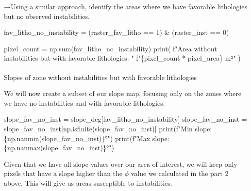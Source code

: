 \documentclass[
  letterpaper,
  DIV=11,
  numbers=noendperiod]{scrartcl}
\makeatletter
\let\oldparagraph\paragraph
\renewcommand{\paragraph}{
    \@ifstar
      \xxxParagraphStar
      \xxxParagraphNoStar
  }
\newcommand{\xxxParagraphStar}[1]{\oldparagraph*{#1}\mbox{}}
\newcommand{\xxxParagraphNoStar}[1]{\oldparagraph{#1}\mbox{}}
\newenvironment{Shaded}{\begin{snugshade}}{\end{snugshade}}
\newcommand{\BuiltInTok}[1]{\textcolor[rgb]{0.00,0.23,0.31}{#1}}
\newcommand{\DecValTok}[1]{\textcolor[rgb]{0.68,0.00,0.00}{#1}}
\newcommand{\NormalTok}[1]{\textcolor[rgb]{0.00,0.23,0.31}{#1}}
\newcommand{\OperatorTok}[1]{\textcolor[rgb]{0.37,0.37,0.37}{#1}}
\newcommand{\SpecialCharTok}[1]{\textcolor[rgb]{0.37,0.37,0.37}{#1}}
\newcommand{\SpecialStringTok}[1]{\textcolor[rgb]{0.13,0.47,0.30}{#1}}
\makeatother
\begin{document}
→Using a similar approach, identify the areas where we have favorable
lithologies but no observed instabilities.

\begin{Shaded}
\begin{Highlighting}[]
\NormalTok{fav\_litho\_no\_instability }\OperatorTok{=}\NormalTok{ (raster\_fav\_litho }\OperatorTok{==} \DecValTok{1}\NormalTok{) }\OperatorTok{\&}\NormalTok{ (raster\_inst }\OperatorTok{==} \DecValTok{0}\NormalTok{)}

\NormalTok{pixel\_count }\OperatorTok{=}\NormalTok{ np.}\BuiltInTok{sum}\NormalTok{(fav\_litho\_no\_instability)}
\BuiltInTok{print}\NormalTok{(}
    \SpecialStringTok{f"Area without instabilities but with favorable lithologies: "}
    \SpecialStringTok{f"}\SpecialCharTok{\{}\NormalTok{pixel\_count }\OperatorTok{*}\NormalTok{ pixel\_area}\SpecialCharTok{\}}\SpecialStringTok{ m²"}
\NormalTok{)}
\end{Highlighting}
\end{Shaded}

\paragraph{Slopes of zone without instabilities but with favorable
lithologies}\label{slopes-of-zone-without-instabilities-but-with-favorable-lithologies}

We will now create a subset of our slope map, focusing only on the zones
where we have no instabilities and with favorable lithologies.

\begin{Shaded}
\begin{Highlighting}[]
\NormalTok{slope\_fav\_no\_inst }\OperatorTok{=}\NormalTok{ slope\_deg[fav\_litho\_no\_instability]}
\NormalTok{slope\_fav\_no\_inst }\OperatorTok{=}\NormalTok{ slope\_fav\_no\_inst[np.isfinite(slope\_fav\_no\_inst)]}
\BuiltInTok{print}\NormalTok{(}\SpecialStringTok{f"Min slope: }\SpecialCharTok{\{}\NormalTok{np}\SpecialCharTok{.}\NormalTok{nanmin(slope\_fav\_no\_inst)}\SpecialCharTok{\}}\SpecialStringTok{°"}\NormalTok{)}
\BuiltInTok{print}\NormalTok{(}\SpecialStringTok{f"Max slope:  }\SpecialCharTok{\{}\NormalTok{np}\SpecialCharTok{.}\NormalTok{nanmax(slope\_fav\_no\_inst)}\SpecialCharTok{\}}\SpecialStringTok{°"}\NormalTok{)}
\end{Highlighting}
\end{Shaded}

Given that we have all slope values over our area of interest, we will
keep only pixels that have a slope higher than the \(\phi\) value we
calculated in the part 2 above. This will give us areas susceptible to
instabilities.
\end{document}
